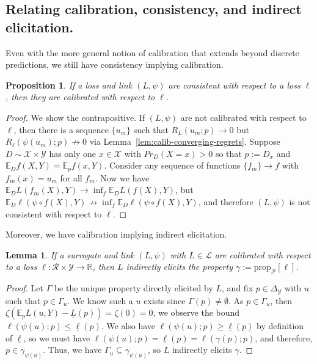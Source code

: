 \documentclass{article} %
\newcommand{\reals}{\mathbb{R}}
\newcommand{\simplex}{\Delta_\Y}
\newcommand{\prop}[2][\mathcal{P}]{\mathrm{prop}_{#1}[#2]}
\newcommand{\E}{\mathbb{E}}
\renewcommand{\L}{\mathcal{L}}
\newcommand{\R}{\mathcal{R}}
\newcommand{\X}{\mathcal{X}}
\newcommand{\Y}{\mathcal{Y}}
\newcommand{\exploss}[3]{\E_{#3} #1(#2,Y)}
\newcommand{\risk}[1]{\underline{#1}}
\newtheorem{lemma}{Lemma}
\newtheorem{proposition}{Proposition}
\begin{document}
\subsection{Relating calibration, consistency, and indirect elicitation.}
Even with the more general notion of calibration that extends beyond discrete predictions, we still have consistency implying calibration.
\begin{proposition}\label{prop:consistent-implies-calibrated}
	If a loss and link $(L, \psi)$ are consistent with respect to a loss $\ell$, then they are calibrated with respect to $\ell$.
\end{proposition}
\begin{proof}
	We show the contrapositive.
	If $(L, \psi)$ are not calibrated with respect to $\ell$, then there is a sequence $\{u_m\}$ such that $R_L(u_m; p) \to 0$ but $R_\ell(\psi(u_m); p) \not \to 0$ via Lemma~\ref{lem:calib-converging-regrets}.
	Suppose $D \sim \X \times\Y$ has only one $x \in \X$ with $Pr_D(X = x) > 0$ so that $p := D_x$ and $\E_D f(X,Y) = \E_p f(x, Y)$.
	Consider any sequence of functions $\{f_m\} \to f$ with $f_m(x) = u_m$ for all $f_m$.
	Now we have $\E_D L(f_m(X), Y) \to \inf_f \E_D L(f(X), Y)$, but $\E_D \ell(\psi \circ f(X), Y) \not \to \inf_f \E_D \ell(\psi \circ f(X), Y)$, and therefore $(L, \psi)$ is not consistent with respect to $\ell$.
\end{proof}

Moreover, we have calibration implying indirect elicitation.
\begin{lemma}\label{lem:calib-implies-indir}
	If a surrogate and link $(L, \psi)$ with $L \in \L$ are calibrated with respect to a loss $\ell:\R \times\Y \to \reals$, then $L$ indirectly elicits the property $\gamma := \prop{\ell}$.
\end{lemma}
\begin{proof}
	Let $\Gamma$ be the unique property directly elicited by $L$, and fix $p \in \simplex$ with $u$ such that $p \in \Gamma_u$.
	We know such a $u$ exists since $\Gamma(p) \neq \emptyset$.
	As $p \in \Gamma_u$, then $\zeta(\exploss{L}{u}{p} - \risk{L}(p)) = \zeta(0) = 0$, we observe the bound $\ell(\psi(u); p) \leq \risk{\ell}(p)$.
	We also have $\ell(\psi(u); p) \geq \risk{\ell}(p)$ by definition of $\risk{\ell}$, so we must have $\ell(\psi(u);p) = \risk{\ell}(p) = \ell(\gamma(p); p)$, and therefore, $p \in \gamma_{\psi(u)}$.
	Thus, we have $\Gamma_u \subseteq \gamma_{\psi(u)}$, so $L$ indirectly elicits $\gamma$.
\end{proof}
\end{document}
